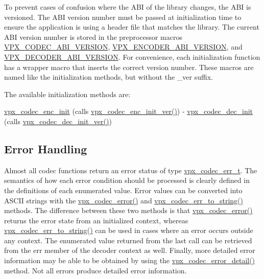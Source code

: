 To prevent cases of confusion where the A\-B\-I of the library changes, the A\-B\-I is versioned. The A\-B\-I version number must be passed at initialization time to ensure the application is using a header file that matches the library. The current A\-B\-I version number is stored in the preprocessor macros \hyperlink{group__codec_gaf7e9cad2df0f81679b881f46740ad097}{V\-P\-X\-\_\-\-C\-O\-D\-E\-C\-\_\-\-A\-B\-I\-\_\-\-V\-E\-R\-S\-I\-O\-N}, \hyperlink{group__encoder_gaa4f0b52293c08ba672429c3a03648b9d}{V\-P\-X\-\_\-\-E\-N\-C\-O\-D\-E\-R\-\_\-\-A\-B\-I\-\_\-\-V\-E\-R\-S\-I\-O\-N}, and \hyperlink{group__decoder_ga462b459e7ae13937e1eae1776245db12}{V\-P\-X\-\_\-\-D\-E\-C\-O\-D\-E\-R\-\_\-\-A\-B\-I\-\_\-\-V\-E\-R\-S\-I\-O\-N}. For convenience, each initialization function has a wrapper macro that inserts the correct version number. These macros are named like the initialization methods, but without the \-\_\-ver suffix.

The available initialization methods are\-:
\begin{DoxyItemize}
\item \hyperlink{group__encoder_ga3d490a2a9a6acd7c9ef82a603155f3cf}{vpx\-\_\-codec\-\_\-enc\-\_\-init} (calls \hyperlink{group__encoder_ga6ed21b96c481c0b6e1b543ef958a57a4}{vpx\-\_\-codec\-\_\-enc\-\_\-init\-\_\-ver()}) -\/ \hyperlink{group__decoder_ga8c2f0b12f1bd4927eb3c68b01eab19d3}{vpx\-\_\-codec\-\_\-dec\-\_\-init} (calls \hyperlink{group__decoder_ga26fe82cf8fd697f885935cea53be964f}{vpx\-\_\-codec\-\_\-dec\-\_\-init\-\_\-ver()})
\end{DoxyItemize}\hypertarget{usage_usage_errors}{}\subsection{Error Handling}\label{usage_usage_errors}
Almost all codec functions return an error status of type \hyperlink{group__codec_gada1084710837ad363b92f2379dd2b8d2}{vpx\-\_\-codec\-\_\-err\-\_\-t}. The semantics of how each error condition should be processed is clearly defined in the definitions of each enumerated value. Error values can be converted into A\-S\-C\-I\-I strings with the \hyperlink{group__codec_ga4d265df00d42b36a4f0e3eb83fc22c5e}{vpx\-\_\-codec\-\_\-error()} and \hyperlink{group__codec_gaaddf5c1f609ef18c7c8800d102fcefa6}{vpx\-\_\-codec\-\_\-err\-\_\-to\-\_\-string()} methods. The difference between these two methods is that \hyperlink{group__codec_ga4d265df00d42b36a4f0e3eb83fc22c5e}{vpx\-\_\-codec\-\_\-error()} returns the error state from an initialized context, whereas \hyperlink{group__codec_gaaddf5c1f609ef18c7c8800d102fcefa6}{vpx\-\_\-codec\-\_\-err\-\_\-to\-\_\-string()} can be used in cases where an error occurs outside any context. The enumerated value returned from the last call can be retrieved from the {\ttfamily err} member of the decoder context as well. Finally, more detailed error information may be able to be obtained by using the \hyperlink{group__codec_ga29273cb552ed1a437fe263c4a0a54300}{vpx\-\_\-codec\-\_\-error\-\_\-detail()} method. Not all errors produce detailed error information.

